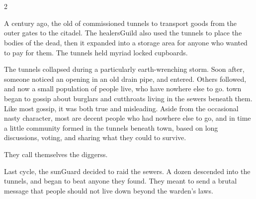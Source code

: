 \section[\glsfmtplural{diggers} Catacombs]{}
\label{sewers}


\begin{multicols}{2}

\begin{exampletext}
  \noindent
  A century ago, the old  of  commissioned tunnels to transport goods from the outer gates to the citadel.
  The \gls{healersGuild} also used the tunnels to place the bodies of the dead, then it expanded into a storage area for anyone who wanted to pay for them.
  The tunnels held myriad locked cupboards.


  The tunnels collapsed during a particularly earth-wrenching \gls{storm}.
  Soon after, someone noticed an opening in an old drain pipe, and entered.
  Others followed, and now a small population of people live, who have nowhere else to go.
  \Gls{town} began to gossip about burglars and cutthroats living in the sewers beneath them.
  Like most gossip, it was both true and misleading.
  Aside from the occasional nasty character, most are decent people who had nowhere else to go, and in time a little community formed in the tunnels beneath \gls{town}, based on long discussions, voting, and sharing what they could to survive.

  They call themselves the \glspl{diggers}.
\end{exampletext}

\sewerMap[t]

\begin{exampletext}
  \label{guardAttackHistory}
  Last \gls{cycle}, the \gls{sunGuard} decided to raid the sewers.
  A dozen descended into the tunnels, and began to beat anyone they found.
  They meant to send a brutal message that people should not live down beyond the \gls{warden}'s laws.


\end{exampletext}
\end{multicols}
